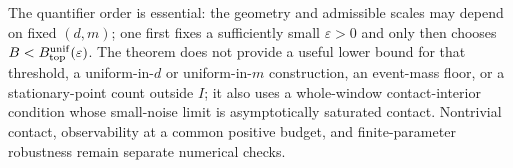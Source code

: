 The quantifier order is essential: the geometry and admissible scales may
depend on fixed $(d,m)$; one first fixes a sufficiently small
$\varepsilon>0$ and only then chooses
$B<B_{\rm top}^{\rm unif}(\varepsilon)$.  The theorem does not provide a
useful lower bound for that threshold, a uniform-in-$d$ or uniform-in-$m$
construction, an event-mass floor, or a stationary-point count outside $I$;
it also uses a whole-window contact-interior condition whose small-noise limit
is asymptotically saturated contact.  Nontrivial contact, observability at a
common positive budget, and finite-parameter robustness remain separate
numerical checks.
